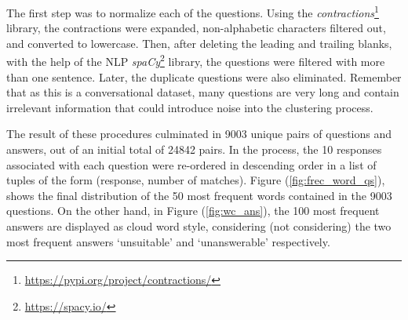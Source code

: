 The first step was to normalize each of the questions. Using the \emph{contractions}\footnote{\url{https://pypi.org/project/contractions/}} library, the contractions were expanded, non-alphabetic characters filtered out, and converted to lowercase. Then, after deleting the leading and trailing blanks, with the help of the NLP \emph{spaCy}\footnote{\url{https://spacy.io/}} library, the questions were filtered with more than one sentence. Later, the duplicate questions were also eliminated. 
Remember that as this is a conversational dataset, many questions are very long and contain irrelevant information that could introduce noise into the clustering process.

The result of these procedures culminated in 9003 unique pairs of questions and answers, out of an initial total of 24842 pairs. In the process, the 10 responses associated with each question were re-ordered in descending order in a list of tuples of the form (response, number of matches). Figure (\ref{fig:frec_word_qs}), shows the final distribution of the 50 most frequent words contained in the 9003 questions. On the other hand, in Figure (\ref{fig:wc_ans}), the 100 most frequent answers are displayed as cloud word style, considering (not considering) the two most frequent answers `unsuitable' and `unanswerable' respectively.

